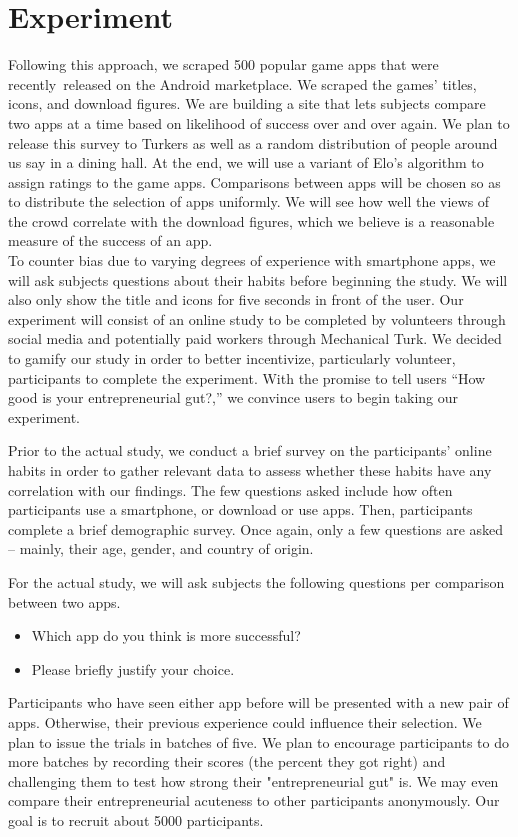 \section{Experiment}


Following this approach, we scraped 500 popular game apps that were recently released on the Android marketplace. We scraped the games' titles, icons, and download figures. We are building a site that lets subjects compare two apps at a time based on likelihood of success over and over again. We plan to release this survey to Turkers as well as a random distribution of people around us say in a dining hall. At the end, we will use a variant of Elo's algorithm to assign ratings to the game apps. Comparisons between apps will be chosen so as to distribute the selection of apps uniformly. We will see how well the views of the crowd correlate with the download figures, which we believe is a reasonable measure of the success of an app. \\

To counter bias due to varying degrees of experience with smartphone apps, we will ask subjects questions about their habits before beginning the study. We will also only show the title and icons for five seconds in front of the user. Our experiment will consist of an online study to be completed by volunteers through social media and potentially paid workers through Mechanical Turk. We decided to gamify our study in order to better incentivize, particularly volunteer, participants to complete the experiment. With the promise to tell users “How good is your entrepreneurial gut?,” we convince users to begin taking our experiment.

Prior to the actual study, we conduct a brief survey on the participants' online habits in order to gather relevant data to assess whether these habits have any correlation with our findings. The few questions asked include how often participants use a smartphone, or download or use apps. Then, participants complete a brief demographic survey. Once again, only a few questions are asked -- mainly, their age, gender, and country of origin.

For the actual study, we will ask subjects the following questions per comparison between two apps.

\begin{itemize}
\item Which app do you think is more successful?
\item Please briefly justify your choice.
\end{itemize}

Participants who have seen either app before will be presented with a new pair of apps. Otherwise, their previous experience could influence their selection. We plan to issue the trials in batches of five. We plan to encourage participants to do more batches by recording their scores (the percent they got right) and challenging them to test how strong their "entrepreneurial gut" is. We may even compare their entrepreneurial acuteness to other participants anonymously. Our goal is to recruit about 5000 participants.
